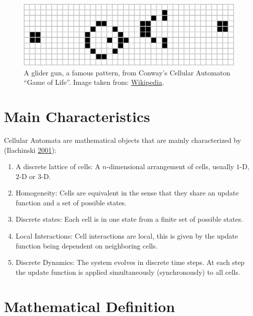 \documentclass[
  12pt,
  openany]{book}
\begin{document}
\begin{figure}

{\centering \includegraphics[width=0.8\linewidth]{pics/Game_of_life_glider_gun} 

}

\caption{A glider gun, a famous pattern, from Conway's Cellular Automaton ``Game of Life''. Image taken from: \href{https://en.wikipedia.org/wiki/File:Game_of_life_glider_gun.svg}{Wikipedia}.}\label{fig:CA-example}
\end{figure}

\hypertarget{main-characteristics}{%
\section{Main Characteristics}\label{main-characteristics}}

Cellular Automata are mathematical objects that are mainly characterized by (Ilachinski \protect\hyperlink{ref-ilachinski2001cellular}{2001}):

\begin{enumerate}
\def\labelenumi{\arabic{enumi}.}
\item
  A discrete lattice of cells:
  A \(n\)-dimensional arrangement of cells, usually \(1\)-D, \(2\)-D or \(3\)-D.
\item
  Homogeneity:
  Cells are equivalent in the sense that they share an update function and a set of possible states.
\item
  Discrete states:
  Each cell is in one state from a finite set of possible states.
\item
  Local Interactions:
  Cell interactions are local, this is given by the update function being dependent on neighboring cells.
\item
  Discrete Dynamics:
  The system evolves in discrete time steps. At each step the update function is applied simultaneously (synchronously) to all cells.
\end{enumerate}

\hypertarget{mathematical-definition}{%
\section{Mathematical Definition}\label{mathematical-definition}}
\end{document}
